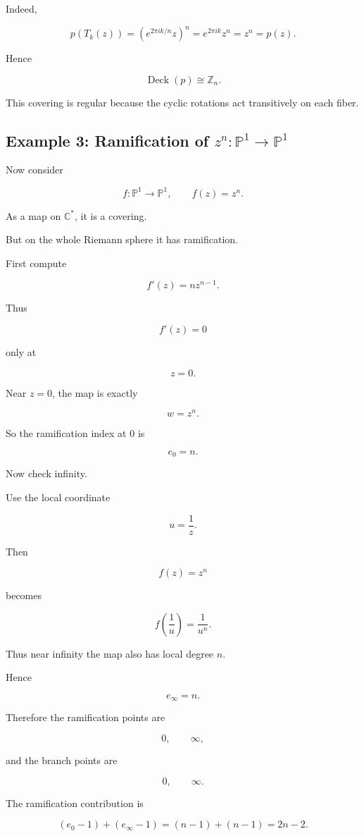 \documentclass[12pt,a4paper]{article}
\theoremstyle{notespace}
\begin{document}
Indeed,

\[
p(T_k(z))
=
\left(e^{2\pi i k/n}z\right)^n
=
e^{2\pi i k}z^n
=
z^n
=
p(z).
\]

Hence

\[
\operatorname{Deck}(p)\cong\mathbb Z_n.
\]

This covering is regular because the cyclic rotations act transitively on each fiber.

\subsection{Example 3: Ramification of \(z^n:\mathbb P^1\to\mathbb P^1\)}

Now consider

\[
f:\mathbb P^1\to\mathbb P^1,
\qquad
f(z)=z^n.
\]

As a map on \(\mathbb C^*\), it is a covering.

But on the whole Riemann sphere it has ramification.

First compute

\[
f'(z)=nz^{n-1}.
\]

Thus

\[
f'(z)=0
\]

only at

\[
z=0.
\]

Near \(z=0\), the map is exactly

\[
w=z^n.
\]

So the ramification index at \(0\) is

\[
e_0=n.
\]

Now check infinity.

Use the local coordinate

\[
u=\frac1z.
\]

Then

\[
f(z)=z^n
\]

becomes

\[
f\left(\frac1u\right)=\frac1{u^n}.
\]

Thus near infinity the map also has local degree \(n\).

Hence

\[
e_\infty=n.
\]

Therefore the ramification points are

\[
0,\qquad \infty,
\]

and the branch points are

\[
0,\qquad \infty.
\]

The ramification contribution is

\[
(e_0-1)+(e_\infty-1)
=
(n-1)+(n-1)
=
2n-2.
\]
\end{document}
